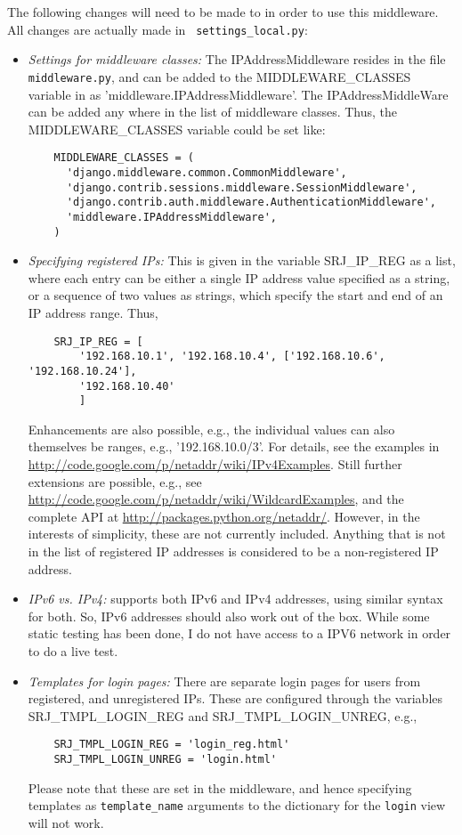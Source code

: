 The following changes will need to be made to \settings in order
to use this middleware. All changes are actually made in {\tt
  settings\_local.py}:
\begin{itemize}
\item\emph{Settings for middleware classes: } The
  IPAddressMiddleware resides in the file {\tt middleware.py},
  and can be added to the MIDDLEWARE\_CLASSES variable in
  \settings as 'middleware.IPAddressMiddleware'. The
  IPAddressMiddleWare can be added any where in the list of
  middleware classes. Thus, the MIDDLEWARE\_CLASSES variable could
  be set like:
  \begin{Verbatim}
    MIDDLEWARE_CLASSES = (
      'django.middleware.common.CommonMiddleware',
      'django.contrib.sessions.middleware.SessionMiddleware',
      'django.contrib.auth.middleware.AuthenticationMiddleware',
      'middleware.IPAddressMiddleware',
    )
  \end{Verbatim}
\item\emph{Specifying registered IPs: } This is given in the
  variable SRJ\_IP\_REG as a list, where each entry can be either a
  single IP address value specified as a string, or a sequence of
  two values as strings, which specify the start and end of an IP
  address range. Thus,
  \begin{Verbatim}
    SRJ_IP_REG = [
        '192.168.10.1', '192.168.10.4', ['192.168.10.6', '192.168.10.24'],
        '192.168.10.40'
        ]
  \end{Verbatim}
  Enhancements are also possible, e.g., the individual values can
  also themselves be ranges, e.g., '192.168.10.0/3'. For details,
  see the examples in
  \url{http://code.google.com/p/netaddr/wiki/IPv4Examples}. Still
  further extensions are possible, e.g., see
  \url{http://code.google.com/p/netaddr/wiki/WildcardExamples},
  and the complete API at
  \url{http://packages.python.org/netaddr/}. However, in the
  interests of simplicity, these are not currently included. Anything
  that is not in the list of registered IP addresses is considered to
  be a non-registered IP address.
\item\emph{IPv6 vs. IPv4: } \netaddr supports both IPv6 and IPv4
addresses, using similar syntax for both. So, IPv6 addresses should
also work out of the box. While some static testing has been done,
I do not have access to a IPV6 network in order to do a live test.
\item\emph{Templates for login pages: } There are separate login
  pages for users from registered, and unregistered IPs. These
  are configured through the variables SRJ\_TMPL\_LOGIN\_REG and
  SRJ\_TMPL\_LOGIN\_UNREG, e.g.,
  \begin{Verbatim}
    SRJ_TMPL_LOGIN_REG = 'login_reg.html'
    SRJ_TMPL_LOGIN_UNREG = 'login.html'
  \end{Verbatim}
  Please note that these are set in the middleware, and hence
  specifying templates as {\tt template\_name} arguments to the
  dictionary for the {\tt login} view will not work.
\end{itemize}
